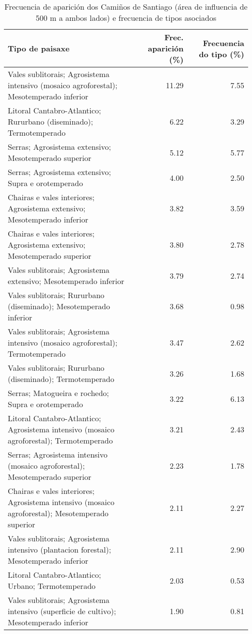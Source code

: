 \begin{table}[p]
\centering
\caption{Frecuencia de aparición dos Camiños de Santiago (área de influencia de 500 m a ambos lados) e frecuencia de tipos asociados} 
\label{vcamino}
\begin{tabular}{lrr}
  \hline
Tipo de paisaxe & Frec. aparición (\%) & Frecuencia do tipo (\%) \\ 
  \hline
Vales sublitorais; Agrosistema intensivo (mosaico agroforestal); Mesotemperado inferior & 11.29 & 7.55 \\ 
  Litoral Cantabro-Atlantico; Rururbano (diseminado); Termotemperado & 6.22 & 3.29 \\ 
  Serras; Agrosistema extensivo; Mesotemperado superior & 5.12 & 5.77 \\ 
  Serras; Agrosistema extensivo; Supra e orotemperado & 4.00 & 2.50 \\ 
  Chairas e vales interiores; Agrosistema extensivo; Mesotemperado inferior & 3.82 & 3.59 \\ 
  Chairas e vales interiores; Agrosistema extensivo; Mesotemperado superior & 3.80 & 2.78 \\ 
  Vales sublitorais; Agrosistema extensivo; Mesotemperado inferior & 3.79 & 2.74 \\ 
  Vales sublitorais; Rururbano (diseminado); Mesotemperado inferior & 3.68 & 0.98 \\ 
  Vales sublitorais; Agrosistema intensivo (mosaico agroforestal); Termotemperado & 3.47 & 2.62 \\ 
  Vales sublitorais; Rururbano (diseminado); Termotemperado & 3.26 & 1.68 \\ 
  Serras; Matogueira e rochedo; Supra e orotemperado & 3.22 & 6.13 \\ 
  Litoral Cantabro-Atlantico; Agrosistema intensivo (mosaico agroforestal); Termotemperado & 3.21 & 2.43 \\ 
  Serras; Agrosistema intensivo (mosaico agroforestal); Mesotemperado superior & 2.23 & 1.78 \\ 
  Chairas e vales interiores; Agrosistema intensivo (mosaico agroforestal); Mesotemperado superior & 2.11 & 2.27 \\ 
  Vales sublitorais; Agrosistema intensivo (plantacion forestal); Mesotemperado inferior & 2.11 & 2.90 \\ 
  Litoral Cantabro-Atlantico; Urbano; Termotemperado & 2.03 & 0.53 \\ 
  Vales sublitorais; Agrosistema intensivo (superficie de cultivo); Mesotemperado inferior & 1.90 & 0.81 \\ 

\end{tabular}
\end{table}
